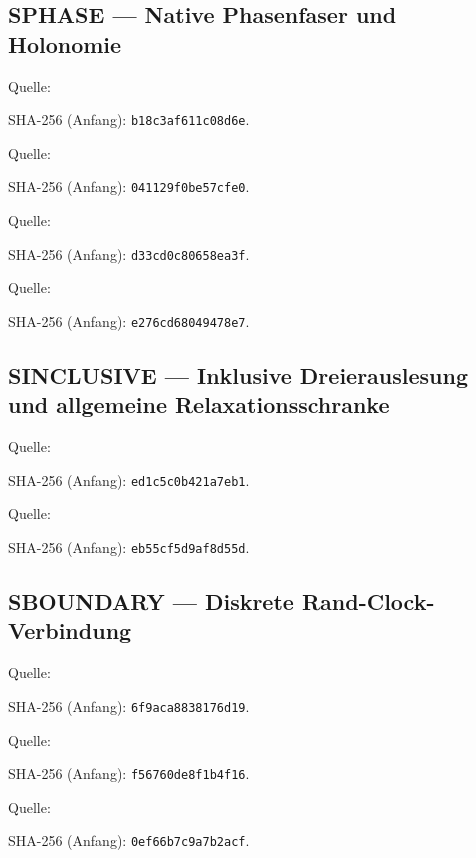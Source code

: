 \documentclass[11pt,a4paper,oneside,parskip=half,headings=normal,numbers=noenddot,bibliography=totoc]{scrreprt}
\begin{document}
\subsection*{SPHASE — Native Phasenfaser und Holonomie}\label{s:PHASE}
Quelle: \par{\footnotesize SHA-256 (Anfang): \texttt{b18c3af611c08d6e}.}\par
Quelle: \par{\footnotesize SHA-256 (Anfang): \texttt{041129f0be57cfe0}.}\par
Quelle: \par{\footnotesize SHA-256 (Anfang): \texttt{d33cd0c80658ea3f}.}\par
Quelle: \par{\footnotesize SHA-256 (Anfang): \texttt{e276cd68049478e7}.}\par
\subsection*{SINCLUSIVE — Inklusive Dreierauslesung und allgemeine Relaxationsschranke}\label{s:INCLUSIVE}
Quelle: \par{\footnotesize SHA-256 (Anfang): \texttt{ed1c5c0b421a7eb1}.}\par
Quelle: \par{\footnotesize SHA-256 (Anfang): \texttt{eb55cf5d9af8d55d}.}\par
\subsection*{SBOUNDARY — Diskrete Rand-Clock-Verbindung}\label{s:BOUNDARY}
Quelle: \par{\footnotesize SHA-256 (Anfang): \texttt{6f9aca8838176d19}.}\par
Quelle: \par{\footnotesize SHA-256 (Anfang): \texttt{f56760de8f1b4f16}.}\par
Quelle: \par{\footnotesize SHA-256 (Anfang): \texttt{0ef66b7c9a7b2acf}.}\par
\end{document}
